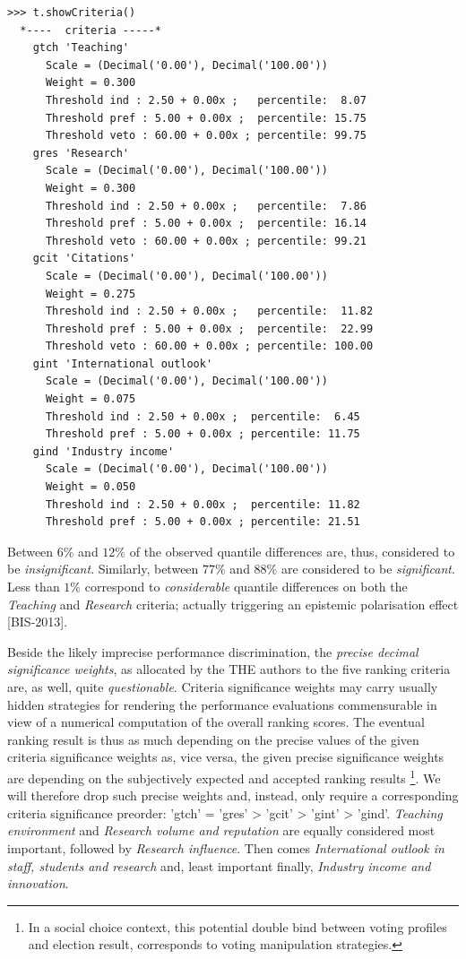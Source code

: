 \begin{lstlisting}[caption={Inspecting the performance discrimination thresholds},label=list:13.6]
>>> t.showCriteria()
  *----  criteria -----*
    gtch 'Teaching'
      Scale = (Decimal('0.00'), Decimal('100.00'))
      Weight = 0.300 
      Threshold ind : 2.50 + 0.00x ;   percentile:  8.07
      Threshold pref : 5.00 + 0.00x ;  percentile: 15.75
      Threshold veto : 60.00 + 0.00x ; percentile: 99.75
    gres 'Research'
      Scale = (Decimal('0.00'), Decimal('100.00'))
      Weight = 0.300 
      Threshold ind : 2.50 + 0.00x ;   percentile:  7.86
      Threshold pref : 5.00 + 0.00x ;  percentile: 16.14
      Threshold veto : 60.00 + 0.00x ; percentile: 99.21
    gcit 'Citations'
      Scale = (Decimal('0.00'), Decimal('100.00'))
      Weight = 0.275 
      Threshold ind : 2.50 + 0.00x ;   percentile:  11.82
      Threshold pref : 5.00 + 0.00x ;  percentile:  22.99
      Threshold veto : 60.00 + 0.00x ; percentile: 100.00
    gint 'International outlook'
      Scale = (Decimal('0.00'), Decimal('100.00'))
      Weight = 0.075 
      Threshold ind : 2.50 + 0.00x ;  percentile:  6.45
      Threshold pref : 5.00 + 0.00x ; percentile: 11.75
    gind 'Industry income'
      Scale = (Decimal('0.00'), Decimal('100.00'))
      Weight = 0.050 
      Threshold ind : 2.50 + 0.00x ;  percentile: 11.82
      Threshold pref : 5.00 + 0.00x ; percentile: 21.51
\end{lstlisting}

Between $6\%$ and $12\%$ of the observed quantile differences are, thus, considered to be \emph{insignificant}. Similarly, between $77\%$ and $88\%$ are considered to be \emph{significant}. Less than $1\%$ correspond to \emph{considerable} quantile differences on both the \emph{Teaching} and \emph{Research} criteria; actually triggering an epistemic polarisation effect [BIS-2013].

Beside the likely imprecise performance discrimination, the \emph{precise decimal significance weights}, as allocated by the THE authors to the five ranking criteria are, as well, quite \emph{questionable}. Criteria significance weights may carry usually hidden strategies for rendering the performance evaluations commensurable in view of a numerical computation of the overall ranking scores. The eventual ranking result is thus as much depending on the precise values of the given criteria significance weights as, vice versa, the given precise significance weights are depending on the subjectively expected and accepted ranking results \footnote{In a social choice context, this potential double bind between voting profiles and election result, corresponds to voting manipulation strategies.}. We will therefore drop such precise weights and, instead, only require a corresponding criteria significance preorder: 'gtch' = 'gres' > 'gcit' > 'gint' > 'gind'. \emph{Teaching environment} and \emph{Research volume and reputation} are equally considered most important, followed by \emph{Research influence}. Then comes \emph{International outlook in staff, students and research} and, least important finally, \emph{Industry income and innovation}.


